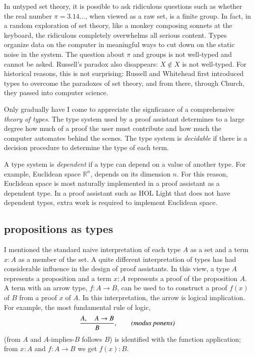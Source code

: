 \documentclass{llncs}
\newcommand{\ring}[1]{\mathbb{#1}}
\begin{document}
In untyped set theory, it is possible to ask ridiculous questions such
as whether the real number $\pi=3.14\ldots$, when viewed as a raw set,
is a finite group.  In fact, in a random exploration of set theory,
like a monkey composing sonnets at the keyboard, the ridiculous
completely overwhelms all serious content.  Types organize data on the
computer in meaningful ways to cut down on the static noise in the
system.  The question about $\pi$ and groups is not well-typed and
cannot be asked.  Russell's paradox also disappears: $X \not\in X$ is
not well-typed.  For historical reasons, this is not surprising:
Russell and Whitehead first introduced types to overcome the paradoxes of
set theory, and from there, through Church, they passed into computer
science.


Only gradually have I come to appreciate the signficance of a
comprehensive {\it theory of types}.  The type system used by a proof
assistant determines to a large degree how much of a proof the user
must contribute and how much the computer automates behind the scenes.
The type system is {\it decidable} if there is a decision procedure to
determine the type of each term.

A type system is {\it dependent} if a type can depend on a value of
another type.  For example, Euclidean space $\ring{R}^n$, depends on
its dimension $n$.  For this reason, Euclidean space is most naturally
implemented in a proof assistant as a dependent type.  
In a proof assistant such as HOL Light that does not have dependent types,
extra work is required to implement Euclidean space.


\subsection{propositions as types}

I mentioned the standard naive interpretation of each type $A$ as a
set and a term $x:A$ as a member of the set.  A quite different
interpretation of types has had considerable influence in the design
of proof assistants.  In this view, a type $A$ represents a
proposition and a term $x:A$ represents a proof of the proposition
$A$.  A term with an arrow type, $f:A\rightarrow B$, can be used to to
construct a proof $f(x)$ of $B$ from a proof $x$ of $A$.  In this
interpretation, the arrow is logical implication. For example,  the most fundamental rule of logic,
\[
\frac{A,\quad A\rightarrow B}{B},  \qquad \text{\it(modus ponens)}
\]
(from $A$ and $A\text{-implies-}B$ follows $B$) is identified with the
function application; from $x:A$ and $f:A\rightarrow B$ we get
$f(x):B$.
\end{document}
